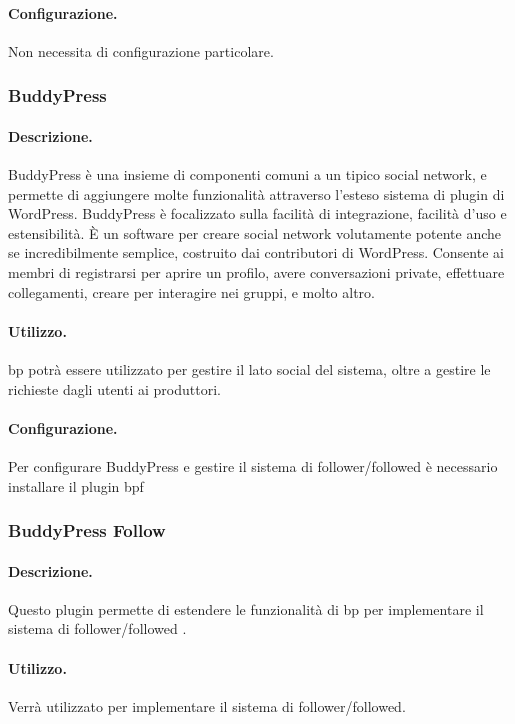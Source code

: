 \paragraph{Configurazione.} Non necessita di configurazione particolare.

\subsubsection{BuddyPress} \label{plugin:bp}
\paragraph{Descrizione.}
BuddyPress è una insieme di componenti comuni a un tipico social network, e permette di aggiungere molte funzionalità attraverso l'esteso sistema di plugin di WordPress.
BuddyPress è focalizzato sulla facilità di integrazione, facilità d'uso e estensibilità. È un software per creare social network volutamente potente anche se incredibilmente semplice, costruito dai contributori di WordPress.
Consente ai membri di registrarsi per aprire un profilo, avere conversazioni private, effettuare collegamenti, creare per interagire nei gruppi, e molto altro. 
\paragraph{Utilizzo.}
\gls{bp} potrà essere utilizzato per gestire il lato social del sistema, oltre a gestire le richieste dagli utenti ai produttori.
\paragraph{Configurazione.}
Per configurare BuddyPress e gestire il sistema di follower/followed è necessario installare il plugin \gls{bpf}

\subsubsection{BuddyPress Follow} \label{plugin:bpf}
\paragraph{Descrizione.}
Questo plugin permette di estendere le funzionalità di \gls{bp} per implementare il sistema di follower/followed .
\paragraph{Utilizzo.} Verrà utilizzato per implementare il sistema di follower/followed.
